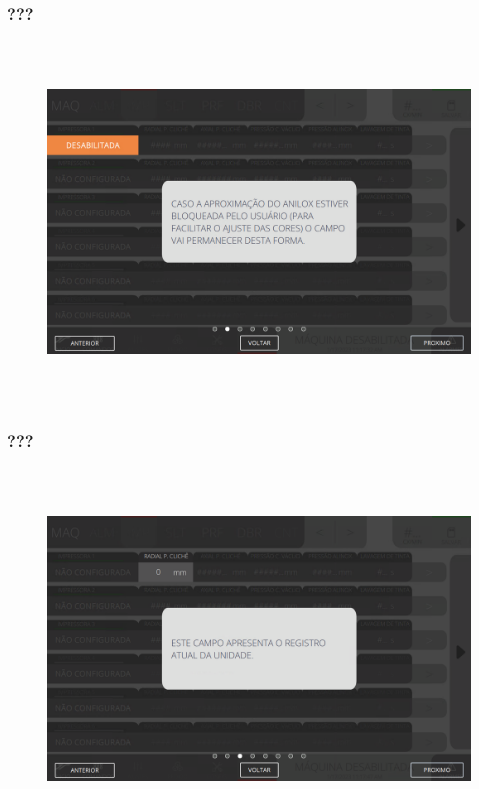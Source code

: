 \newpage
\thispagestyle{fancy}
\vspace*{\fill}
\subsubsection{\small{???}}
\begin{figure}[h]
  \centering
  \includegraphics[width=576px,height=360px]{src/imagesFlexo/04-printter/01-printters/settings/e-2.png}
   \label{}
\end{figure}
\vspace*{\fill}

\newpage
\thispagestyle{fancy}
\vspace*{\fill}
\subsubsection{\small{???}}
\begin{figure}[h]
  \centering
  \includegraphics[width=576px,height=360px]{src/imagesFlexo/04-printter/01-printters/settings/e-3.png}
   \label{}
\end{figure}
\vspace*{\fill}

